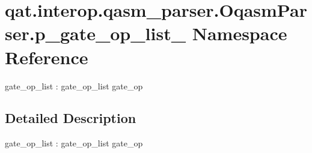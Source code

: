 \hypertarget{namespaceqat_1_1interop_1_1qasm__parser_1_1OqasmParser_1_1p__gate__op__list__1}{\section{qat.\-interop.\-qasm\-\_\-parser.\-Oqasm\-Parser.\-p\-\_\-gate\-\_\-op\-\_\-list\-\_ Namespace Reference}
\label{namespaceqat_1_1interop_1_1qasm__parser_1_1OqasmParser_1_1p__gate__op__list__1}
}


gate\-\_\-op\-\_\-list \-: gate\-\_\-op\-\_\-list gate\-\_\-op  




\subsection{Detailed Description}
gate\-\_\-op\-\_\-list \-: gate\-\_\-op\-\_\-list gate\-\_\-op 